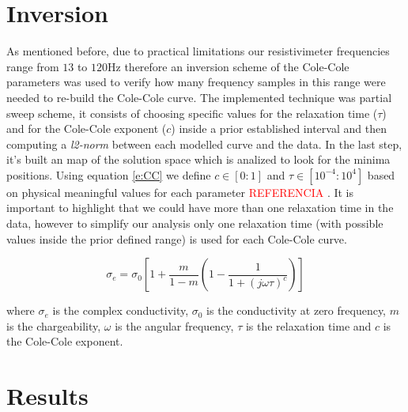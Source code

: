 \documentclass{vie16}
\newcommand{\att}[1]{\textcolor{red}{#1}}
\begin{document}
\section{Inversion}
As mentioned before, due to practical limitations our resistivimeter frequencies 
range from $13$ to $120$Hz therefore an inversion scheme of the Cole-Cole parameters 
was used to verify how many frequency samples in this range were needed to
re-build the Cole-Cole curve. The implemented technique was partial sweep scheme,
it consists of choosing specific values for the relaxation time
($\tau$) and for the Cole-Cole exponent ($c$) inside a prior
established interval and then computing a \textit{l2-norm} between
each modelled curve and the data. In the last step, it's built an map
of the solution space which is analized to look for the minima
positions.  Using equation \ref{e:CC} we define $c \in [0:1]$ and
$\tau \in [10^{-4}:10^{4}]$ based on physical meaningful values for each
parameter \att{REFERENCIA}
. It is important to highlight that we could have more than
one relaxation time in the data, however to simplify our analysis only
one relaxation time (with possible values inside the prior defined
range) is used for each Cole-Cole curve.



\begin{equation}
	\sigma_{e} = \sigma_{0}
			\left[
			1 + \frac{m}{1-m}
						\left( 
								1 - \frac{1}{1+ \left( j\omega\tau \right)^{c} }	
						\right) 			
			\right]
	\label{e:CC}
\end{equation}

where $\sigma_{e}$ is the complex conductivity, $\sigma_{0}$ is the
conductivity at zero frequency, $m$ is the chargeability, $\omega$ is 
the angular frequency, $\tau$ is the relaxation time and $c$ is the 
Cole-Cole exponent.


\section{Results}



\end{document}
